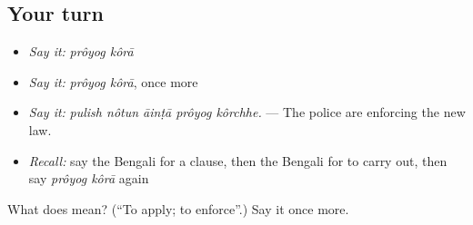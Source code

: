 \subsection*{Your turn}
\begin{itemize}
\raggedright
  \item \emph{Say it:} \emph{prôyog kôrā}
  \item \emph{Say it:} \emph{prôyog kôrā}, once more
  \item \emph{Say it:} \emph{pulish nôtun āinṭā prôyog kôrchhe.} — The police are enforcing the new law.
  \item \emph{Recall:} say the Bengali for a clause, then the Bengali for to carry out, then say \emph{prôyog kôrā} again
\end{itemize}

\begin{tcolorbox}[breakable,colback=teal!4,colframe=teal!35!black,title={Before you move on}]
What does   mean? (\textquotedblleft{}To apply; to enforce\textquotedblright{}.) Say it once more.
\end{tcolorbox}
